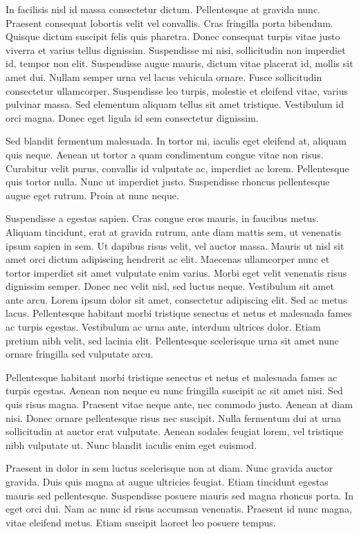 \documentclass[a4paper]{article}
\begin{document}
In facilisis nisl id massa consectetur dictum. Pellentesque at gravida nunc. Praesent consequat lobortis velit vel convallis. Cras fringilla porta bibendum. Quisque dictum suscipit felis quis pharetra. Donec consequat turpis vitae justo viverra et varius tellus dignissim. Suspendisse mi nisi, sollicitudin non imperdiet id, tempor non elit. Suspendisse augue mauris, dictum vitae placerat id, mollis sit amet dui. Nullam semper urna vel lacus vehicula ornare. Fusce sollicitudin consectetur ullamcorper. Suspendisse leo turpis, molestie et eleifend vitae, varius pulvinar massa. Sed elementum aliquam tellus sit amet tristique. Vestibulum id orci magna. Donec eget ligula id sem consectetur dignissim.

Sed blandit fermentum malesuada. In tortor mi, iaculis eget eleifend at, aliquam quis neque. Aenean ut tortor a quam condimentum congue vitae non risus. Curabitur velit purus, convallis id vulputate ac, imperdiet ac lorem. Pellentesque quis tortor nulla. Nunc ut imperdiet justo. Suspendisse rhoncus pellentesque augue eget rutrum. Proin at nunc neque.

Suspendisse a egestas sapien. Cras congue eros mauris, in faucibus metus. Aliquam tincidunt, erat at gravida rutrum, ante diam mattis sem, ut venenatis ipsum sapien in sem. Ut dapibus risus velit, vel auctor massa. Mauris ut nisl sit amet orci dictum adipiscing hendrerit ac elit. Maecenas ullamcorper nunc et tortor imperdiet sit amet vulputate enim varius. Morbi eget velit venenatis risus dignissim semper. Donec nec velit nisl, sed luctus neque. Vestibulum sit amet ante arcu. Lorem ipsum dolor sit amet, consectetur adipiscing elit. Sed ac metus lacus. Pellentesque habitant morbi tristique senectus et netus et malesuada fames ac turpis egestas. Vestibulum ac urna ante, interdum ultrices dolor. Etiam pretium nibh velit, sed lacinia elit. Pellentesque scelerisque urna sit amet nunc ornare fringilla sed vulputate arcu.

Pellentesque habitant morbi tristique senectus et netus et malesuada fames ac turpis egestas. Aenean non neque eu nunc fringilla suscipit ac sit amet nisi. Sed quis risus magna. Praesent vitae neque ante, nec commodo justo. Aenean at diam nisi. Donec ornare pellentesque risus nec suscipit. Nulla fermentum dui at urna sollicitudin at auctor erat vulputate. Aenean sodales feugiat lorem, vel tristique nibh vulputate ut. Nunc blandit iaculis enim eget euismod.

Praesent in dolor in sem luctus scelerisque non at diam. Nunc gravida auctor gravida. Duis quis magna at augue ultricies feugiat. Etiam tincidunt egestas mauris sed pellentesque. Suspendisse posuere mauris sed magna rhoncus porta. In eget orci dui. Nam ac nunc id risus accumsan venenatis. Praesent id nunc magna, vitae eleifend metus. Etiam suscipit laoreet leo posuere tempus.
\end{document}
